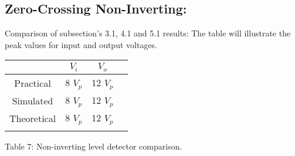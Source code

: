 \subsection{Zero-Crossing Non-Inverting:}

Comparison of subsection's 3.1, 4.1 and 5.1 results: The table will illustrate the peak values for input and output voltages. \hfill \break

\begin{center}
\begin{tabular}[.5cm]{c c c c}
\toprule
\toprule
& \hspace{90pt} $V_{i}$ \hspace{90pt} & \hspace{90pt} $V_{o}$ \hspace{90pt} \\
\midrule
\midrule
Practical & 8 $V_{p}$ &12 $V_{p}$ \\
\cmidrule{1-3}
Simulated & 8 $V_{p}$ &12 $V_{p}$ \\
\cmidrule{1-3}
Theoretical & 8 $V_{p}$ & 12 $V_{p}$ \\
\bottomrule
\linebreak
\end{tabular}
\linebreak Table 7: Non-inverting level detector comparison.
\end{center}
